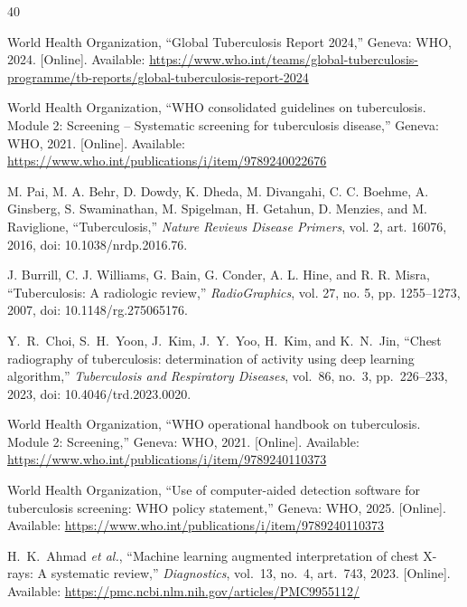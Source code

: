 \documentclass[conference, letterpaper]{IEEEtran}
\begin{document}
\begin{thebibliography}{40}

World Health Organization, ``Global Tuberculosis Report 2024,'' Geneva: WHO, 2024. [Online]. Available: \url{https://www.who.int/teams/global-tuberculosis-programme/tb-reports/global-tuberculosis-report-2024}

World Health Organization, ``WHO consolidated guidelines on tuberculosis. Module 2: Screening -- Systematic screening for tuberculosis disease,'' Geneva: WHO, 2021. [Online]. Available: \url{https://www.who.int/publications/i/item/9789240022676}

M. Pai, M. A. Behr, D. Dowdy, K. Dheda, M. Divangahi, C. C. Boehme, A. Ginsberg, S. Swaminathan, M. Spigelman, H. Getahun, D. Menzies, and M. Raviglione, ``Tuberculosis,'' \emph{Nature Reviews Disease Primers}, vol. 2, art. 16076, 2016, doi: 10.1038/nrdp.2016.76.

J. Burrill, C. J. Williams, G. Bain, G. Conder, A. L. Hine, and R. R. Misra, ``Tuberculosis: A radiologic review,'' \emph{RadioGraphics}, vol. 27, no. 5, pp. 1255--1273, 2007, doi: 10.1148/rg.275065176.

Y.~R.~Choi, S.~H.~Yoon, J.~Kim, J.~Y.~Yoo, H.~Kim, and K.~N.~Jin, ``Chest radiography of tuberculosis: determination of activity using deep learning algorithm,'' \textit{Tuberculosis and Respiratory Diseases}, vol.~86, no.~3, pp.~226--233, 2023, doi: 10.4046/trd.2023.0020.

World Health Organization, ``WHO operational handbook on tuberculosis. Module 2: Screening,'' Geneva: WHO, 2021. [Online]. Available: \url{https://www.who.int/publications/i/item/9789240110373}

World Health Organization, ``Use of computer-aided detection software for tuberculosis screening: WHO policy statement,'' Geneva: WHO, 2025. [Online]. Available: \url{https://www.who.int/publications/i/item/9789240110373}

H.~K.~Ahmad \textit{et al.}, ``Machine learning augmented interpretation of chest X-rays: A systematic review,'' \textit{Diagnostics}, vol.~13, no.~4, art.~743, 2023. [Online]. Available: \url{https://pmc.ncbi.nlm.nih.gov/articles/PMC9955112/}


\end{thebibliography}
\end{document}
